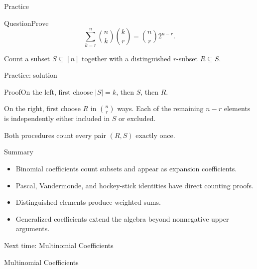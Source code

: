 \documentclass[aspectratio=169,11pt]{beamer}
\renewcommand{\Proof}[1]{\begin{block}{Proof}\normalsize #1\end{block}}
\newcommand{\Question}[1]{\begin{block}{Question}#1\end{block}}
\newcommand{\gap}{\par\medskip}
\begin{document}
\begin{frame}{Practice}
\large
\Question{Prove
\[\sum_{k=r}^n\binom nk\binom kr=\binom nr2^{n-r}.\]}
\gap Count a subset $S\subseteq[n]$ together with a distinguished $r$-subset $R\subseteq S$.
\end{frame}
\begin{frame}{Practice: solution}
\large
\Proof{On the left, first choose $|S|=k$, then $S$, then $R$.\gap On the right, first choose $R$ in $\binom nr$ ways. Each of the remaining $n-r$ elements is independently either included in $S$ or excluded.\gap Both procedures count every pair $(R,S)$ exactly once.}
\end{frame}
\begin{frame}{Summary}
\large
\begin{itemize}
\item Binomial coefficients count subsets and appear as expansion coefficients.
\item Pascal, Vandermonde, and hockey-stick identities have direct counting proofs.
\item Distinguished elements produce weighted sums.
\item Generalized coefficients extend the algebra beyond nonnegative upper arguments.
\end{itemize}
\end{frame}
\begin{frame}{Next time: Multinomial Coefficients}\begin{center}{\Huge Multinomial Coefficients}\end{center}\end{frame}
\end{document}
